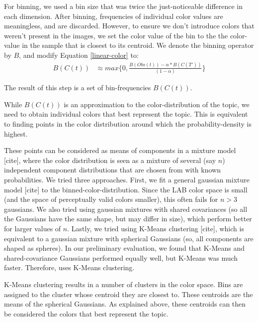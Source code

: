 For binning, we used a bin size that was twice the just-noticeable difference in each dimension. After binning, frequencies of individual color values are meaningless, and are discarded. However, to ensure we don't introduce colors that weren't present in the images, we set the color value of the bin to the the color-value in the sample that is closest to its centroid. We denote the binning operator by $B$, and modify Equation \ref{linear-color} to:
\begin{align}
\label{linear-color-bin}  
B(C(t)) &\approx max\{0,\frac{B(Obs(t)) - \alpha*B(C(T'))}{(1-\alpha)}\}
\end{align}

The result of this step is a set of bin-frequencies $B(C(t))$.

While $B(C(t))$ is an approximation to the color-distribution of the topic, we need to obtain individual colors that best represent the topic. This is equivalent to finding points in the color distribution around which the probability-density is highest. 

These points can be considered as means of components in a mixture model [cite], where the color distribution is seen as a mixture of several (say $n$) independent component distributions  that are chosen from with known probabilities. We tried three approaches. First, we fit a general gaussian mixture model [cite] to the binned-color-distribution. Since the LAB color space is small (and the space of perceptually valid colors smaller), this often fails for $n>3$ gaussians. We also tried using gaussian mixtures with shared covariances (so all the Gaussians have the same shape, but may differ in size), which perform better for larger values of $n$. Lastly, we tried using K-Means clustering [cite], which is equivalent to a gaussian mixture with spherical Gaussians (so, all components are shaped as spheres). In our preliminary evaluation, we found that K-Means and shared-covariance Gaussians performed equally well, but K-Means was much faster. Therefore, \system uses K-Means clustering.

K-Means clustering results in a number of clusters in the color space. Bins are assigned to the cluster whose centroid they are closest to. These centroids are the means of the spherical Gaussians. As explained above, these centroids can then be considered the colors that best represent the topic.


